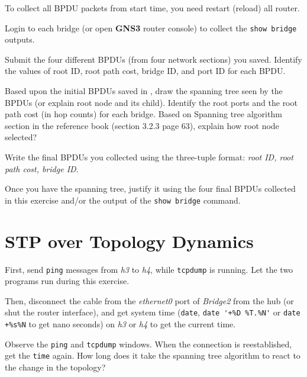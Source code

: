 \documentclass{../UTNetLab}
\begin{document}
    To collect all BPDU packets from start time, you need restart (reload) all router.

    Login to each bridge (or open \textbf{GNS3} router console) to collect the \lstinline[language={cisco}]{show bridge} outputs.
    
    \begin{report}
        \item Submit the four different BPDUs (from four network sections) you saved.
            Identify the values of root ID, root path cost, bridge ID, and port ID for each BPDU.

        \item Based upon the initial BPDUs saved in , draw the spanning tree seen by the BPDUs (or explain root node and its child).
            Identify the root ports and the root path cost (in hop counts) for each bridge.
            Based on Spanning tree algorithm section in the reference book (section 3.2.3 page 63), explain how root node selected?

        \item Write the final BPDUs you collected using the three-tuple format: \textit{{root ID, root path cost, bridge ID}}.

        \item Once you have the spanning tree, justify it using the four final BPDUs collected in this exercise and/or the output of the \lstinline[language={cisco}]{show bridge} command.
    \end{report}


\section{STP over Topology Dynamics}
    First, send \lstinline{ping} messages from \textit{h3} to \textit{h4}, while \lstinline{tcpdump} is running.
    Let the two programs run during this exercise.

    Then, disconnect the cable from the \textit{ethernet0} port of \textit{Bridge2} from the hub (or shut the router interface), and get system time (\lstinline{date}, \lstinline{date '+%D %T.%N'} or \lstinline{date +%s%N} to get nano seconds) on \textit{h3} or \textit{h4} to get the current time.

    Observe the \lstinline{ping} and \lstinline{tcpdump} windows.
    When the connection is reestablished, get the \lstinline{time} again.
    How long does it take the spanning tree algorithm to react to the change in the topology?
\end{document}
